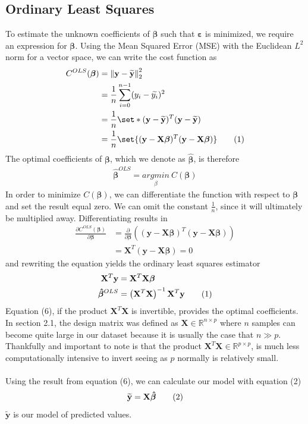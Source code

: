 \documentclass[a4paper,twocolumn]{article}
\DeclarePairedDelimiter\set\{\}
\newcommand\numberthis{\addtocounter{equation}{1}\tag{\theequation}}
\newcommand{\R}{\mathbb{R}}
\newcommand{\y}{\mathbf{y}}
\newcommand{\ytilde}{\mathbf{\widetilde{y}}}
\newcommand{\X}{\mathbf{X}}
\newcommand{\B}{\boldsymbol{\beta}}
\newcommand{\Bhat}{\boldsymbol{\hat{\beta}}}
\newcommand{\eps}{\boldsymbol{\varepsilon}}
\newcommand{\norm}[1]{\left\lVert#1\right\rVert}
\begin{document}
\subsection{Ordinary Least Squares}
To estimate the unknown coefficients of $\B$ such that $\eps$ is minimized, we require an expression for $\B$. Using the Mean Squared Error (MSE) with the Euclidean $L^{2}$ norm for a vector space, we can write the cost function as
\begin{align*}
    C^{OLS}(\B) &= \norm{\y - \ytilde}_{2}^{2}\\
    &= \frac{1}{n}\sum_{i=0}^{n - 1} (y_{i} - \widetilde{y_{i}})^{2}\\
    &= \frac{1}{n}\set*{(\y - \ytilde)^{T}(\y - \ytilde)}\\
    &= \frac{1}{n}\set{(\y - \X\B)^{T}(\y - \X\B)}\numberthis\label{eqn}
\end{align*}
The optimal coefficients of $\B$, which we denote as $\Bhat$, is therefore
\begin{align}
    \Bhat^{OLS} = \underset{\beta}{argmin} \ C(\B)
\end{align}
In order to minimize $C(\B)$, we can differentiate the function with respect to $\B$ and set the result equal zero. We can omit the constant $\frac{1}{n}$, since it will ultimately be multiplied away. Differentiating results in
\begin{align*}
    \frac{\partial C^{OLS}(\B)}{\partial \B} &= \frac{\partial}{\partial \B}\left((\y - \X\B)^{T}(\y - \X\B)\right)\\
    &= \X^{T}(\y - \X\B) = 0
\end{align*}
and rewriting the equation yields the ordinary least squares estimator
\begin{align*}
    \X^{T}\y &= \X^{T}\X\B\\
    \Bhat^{OLS} &= \left(\X^{T}\X\right)^{-1}\X^{T}\y \numberthis\label{eqn}
\end{align*}
Equation (6), if the product $\X^{T}\X$ is invertible, provides the optimal coefficients. In section 2.1, the design matrix was defined as $\X \in \R^{n\times p}$ where $n$ samples can become quite large in our dataset because it is usually the case that $n \gg p$. Thankfully and important to note is that the product $\X^{T}\X \in \R^{p \times p}$, is much less computationally intensive to invert seeing as $p$ normally is relatively small.\\
\\
Using the result from equation (6), we can calculate our model with equation (2)
\begin{align*}
    \ytilde = \X\Bhat\numberthis\label{eqn}
\end{align*}
$\ytilde$ is our model of predicted values.
\end{document}
